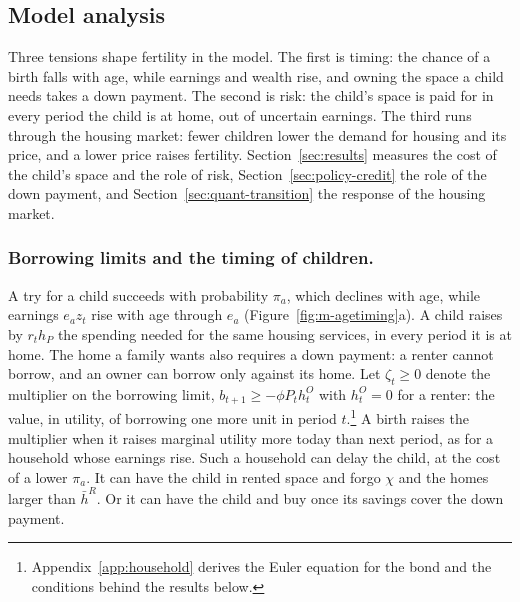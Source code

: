 \subsection{Model analysis}
\label{sec:m-analysis}

Three tensions shape fertility in the model. The first is timing: the chance
of a birth falls with age, while earnings and wealth rise, and owning the
space a child needs takes a down payment. The second is risk: the child's
space is paid for in every period the child is at home, out of uncertain
earnings. The third runs through the housing market: fewer children lower the
demand for housing and its price, and a lower price raises fertility.
Section~\ref{sec:results} measures the cost of the child's space and the role
of risk, Section~\ref{sec:policy-credit} the role of the down payment, and
Section~\ref{sec:quant-transition} the response of the housing market.

\subsubsection*{Borrowing limits and the timing of children.}
A try for a child succeeds with probability $\pi_a$, which declines with age,
while earnings $e_az_t$ rise with age through $e_a$
(Figure~\ref{fig:m-agetiming}a). A child raises by $r_th_P$ the spending
needed for the same housing services, in every period it is at home. The home
a family wants also requires a down payment: a renter cannot borrow, and an
owner can borrow only against its home. Let $\zeta_t\ge0$ denote the
multiplier on the borrowing limit, $b_{t+1}\ge-\phi P_th^O_t$ with $h^O_t=0$
for a renter: the value, in utility, of borrowing one more unit in period
$t$.\footnote{Appendix~\ref{app:household} derives the Euler equation for the
bond and the conditions behind the results below.} A birth raises the
multiplier when it raises marginal utility more today than next period, as
for a household whose earnings rise. Such a household can delay the child, at
the cost of a lower $\pi_a$. It can have the child in rented space and forgo
$\chi$ and the homes larger than $\bar h^R$. Or it can have the child and buy
once its savings cover the down payment.

